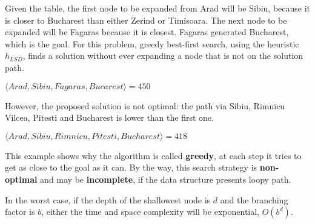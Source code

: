 \begin{example}
    Given the table, the first node to be expanded from Arad will be Sibiu, because it is closer to Bucharest than either Zerind or Timisoara. The next node to be expanded
    will be Fagaras because it is closest. Fagaras generated Bucharest, which is the goal. For this problem, greedy best-first search, using the heuristic $h_{LSD}$, finds 
    a solution without ever expanding a node that is not on the solution path. \vspace{3.5pt} 

    \begin{center}
        $\langle Arad, Sibiu, Fagaras, Bucarest\rangle = 450$
    \end{center} \vspace{3.5pt}

    However, the proposed solution is not optimal: the path via Sibiu, Rimnicu Vilcea, Pitesti and Bucharest is lower than the first one. \vspace{3.5pt}

    \begin{center}
        $\langle Arad, Sibiu, Rimnicu, Pitesti, Bucharest\rangle = 418$
    \end{center} \vspace{3.5pt}
\end{example}
This example shows why the algorithm is called \textbf{greedy}, at each step it tries to get as close to the goal as it can. By the way, this search strategy is \textbf{non-optimal}
and may be \textbf{incomplete}, if the data structure presents loopy path. \vspace{3.5pt}

In the worst case, if the depth of the shallowest node is $d$ and the branching factor is $b$, either the time and space complexity will be exponential, $O(b^d)$.